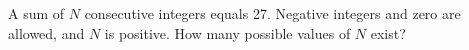 A sum of $ N $ consecutive integers equals 27. Negative integers and zero are allowed, and $ N $ is positive. How many possible values of $ N $ exist?

